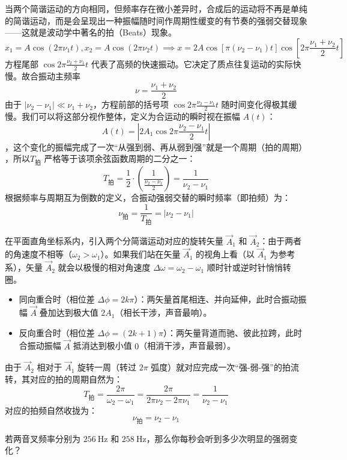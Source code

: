 \documentclass[lang=cn,11pt]{elegantbook}
\begin{document}
\begin{definition}[拍与拍频]
当两个简谐运动的方向相同，但频率存在微小差异时，合成后的运动将不再是单纯的简谐运动，而是会呈现出一种振幅随时间作周期性缓变的有节奏的强弱交替现象——这就是波动学中著名的拍（Beats）现象。
\[x_1=A\cos(2\pi\nu_1 t),x_2=A\cos(2\pi\nu_2 t)\implies x=2A\cos\left[\pi(\nu_2-\nu_1)t\right]\cos\left[2\pi\frac{\nu_1+\nu_2}{2}t\right]\]
方程尾部 $\cos 2\pi \frac{\nu_2 + \nu_1}{2} t$ 代表了高频的快速振动。它决定了质点往复运动的实际快慢。故合振动主频率$$\nu = \frac{\nu_1 + \nu_2}{2}$$
由于 $|\nu_2 - \nu_1| \ll \nu_1 + \nu_2$，方程前部的括号项 $\cos 2\pi \frac{\nu_2 - \nu_1}{2} t$ 随时间变化得极其缓慢。我们可以将这部分视作整体，定义为合运动的瞬时视在振幅 $A(t)$：$$A(t) = \left| 2A_1 \cos 2\pi \frac{\nu_2 - \nu_1}{2} t \right|$$，这个变化的振幅完成了一次“从强到弱、再从弱到强”就是一个周期（拍的周期） ，所以$T_{\text{拍}}$ 严格等于该项余弦函数周期的二分之一：$$T_{\text{拍}} = \frac{1}{2} \cdot \left( \frac{1}{\frac{\nu_2 - \nu_1}{2}} \right) = \boxed{\frac{1}{\nu_2 - \nu_1}}$$根据频率与周期互为倒数的定义，合振动强弱交替的瞬时频率（即拍频）为：$$\nu_{\text{拍}} = \frac{1}{T_{\text{拍}}} = \boxed{|\nu_2 - \nu_1|}$$
\end{definition}

\begin{note}
在平面直角坐标系内，引入两个分简谐运动对应的旋转矢量 $\vec{A}_1$ 和 $\vec{A}_2$：由于两者的角速度不相等（$\omega_2 > \omega_1$）。如果我们站在矢量 $\vec{A}_1$ 的视角上看（以 $\vec{A}_1$ 为参考系），矢量 $\vec{A}_2$ 就会以极慢的相对角速度 $\Delta \omega = \omega_2 - \omega_1$ 顺时针或逆时针悄悄转圈。
\begin{itemize}
\item 同向重合时（相位差 $\Delta \phi = 2k\pi$）：两矢量首尾相连、并向延伸，此时合振动振幅 $\vec{A}$ 叠加达到极大值 $2A_1$（相长干涉，声音最响）。
\item 反向重合时（相位差 $\Delta \phi = (2k+1)\pi$）：两矢量背道而驰、彼此拉跨，此时合振动振幅 $\vec{A}$ 抵消达到极小值 $0$（相消干涉，声音最弱）。
\end{itemize}
由于 $\vec{A}_2$ 相对于 $\vec{A}_1$ 旋转一周（转过 $2\pi$ 弧度）就对应完成一次“强-弱-强”的拍流转，其对应的拍的周期自然为：$$T_{\text{拍}} = \frac{2\pi}{\omega_2 - \omega_1} = \frac{2\pi}{2\pi \nu_2 - 2\pi \nu_1} = \frac{1}{\nu_2 - \nu_1}$$对应的拍频自然收拢为：$$\nu_{\text{拍}} = \nu_2 - \nu_1$$
\end{note}

\begin{exercise}[拍频听起来在说什么]
若两音叉频率分别为 \(256\ \text{Hz}\) 和 \(258\ \text{Hz}\)，那么你每秒会听到多少次明显的强弱变化？
\end{exercise}
\end{document}
